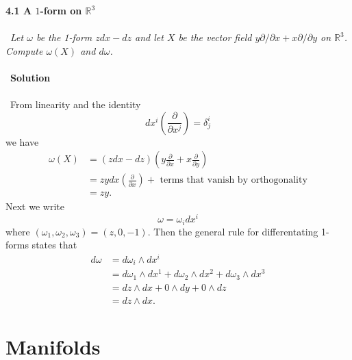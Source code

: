 \documentclass[12 pt]{article}
\newcommand{\R}{\mathbb{R}}
\newcommand{\LP}{\left(}
\newcommand{\RP}{\right)}
\newcommand{\PA}[2]{\frac{\partial #1}{\partial #2}}
\newcommand{\D}{\partial}
\numberwithin{equation}{section}
\begin{document}
\textbf{4.1 A $1$-form on $\R^3$}\\
\\
\
\textit{Let $\omega$ be the 1-form $zdx - dz$ and let $X$ be the vector field $y \D / \D x + x \D / \D y$ on $\R^3$. Compute $\omega(X)$ and $d \omega$.}\\
\\
\
\textbf{Solution}\\
\\
\
From linearity and the identity \begin{equation*}
dx^i \LP \PA{}{x^j} \RP = \delta^i _j
\end{equation*}
we have
\begin{align*}
\omega(X) & = (z dx - dz) \LP y \PA{}{x} + x \PA{}{y} \RP \\
\ & = z y dx \LP \PA{}{x} \RP + \mbox{ terms that vanish by orthogonality} \\
\ & = z y.
\end{align*}
Next we write \begin{equation*}
\omega = \omega_i dx^i
\end{equation*}
where $\LP \omega_1, \omega_2, \omega_3\RP = (z, 0, -1)$. Then the general rule for differentating 1-forms states that \begin{align*}
d \omega & = d \omega_i \wedge dx^i \\
\ & = d \omega_1 \wedge dx^1 + d \omega_2 \wedge dx^2  + d \omega_3 \wedge dx^3 \\
\ & = dz \wedge dx + 0 \wedge dy + 0 \wedge dz \\
\ & = dz \wedge dx.
\end{align*}





















\section{Manifolds}
\end{document}
